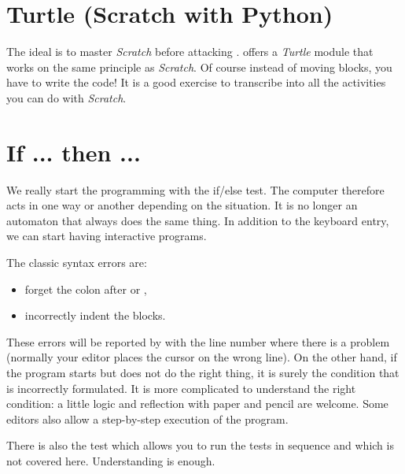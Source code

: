 \documentclass[11pt,class=report,crop=false]{standalone}
\begin{document}
\section{Turtle (Scratch with Python)}

The ideal is to master \emph{Scratch} before attacking \Python{}.
\Python{} offers a \emph{Turtle} module that works on the same principle as  \emph{Scratch}.
Of course instead of moving blocks, you have to write the code!
It is a good exercise to transcribe into \Python{} all the activities you can do with \emph{Scratch}.


\section{If ... then ...}

We really start the programming with the \og{}if/else\fg{} test.
The computer therefore acts in one way or another depending on the situation. It is no longer an automaton that always does the same thing. In addition to the keyboard entry, we can start having interactive programs.

The classic syntax errors are:
\begin{itemize}
  \item forget the colon after  or ,
  \item incorrectly indent the blocks.
\end{itemize}
These errors will be reported by \Python{} with the line number where there is a problem (normally your editor places the cursor on the wrong line).
On the other hand, if the program starts but does not do the right thing, it is surely the condition that is incorrectly formulated. It is more complicated to understand the right condition: a little logic and reflection with paper and pencil are welcome. 
Some editors also allow a step-by-step execution of the \Python{} program.

There is also the test
which allows you to run the tests in sequence and which is not covered here. 
Understanding  is enough.
\end{document}
